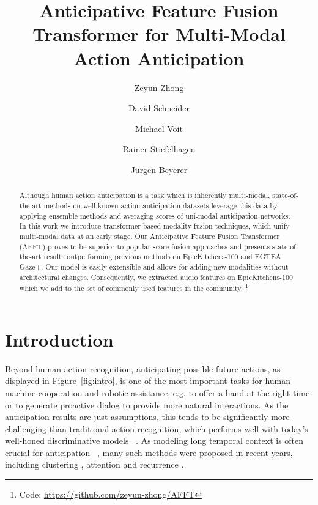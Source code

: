 \documentclass[10pt,twocolumn,letterpaper,dvipsnames]{article}
\begin{document}
\title{Anticipative Feature Fusion Transformer for Multi-Modal Action Anticipation}

\author[1,2\thanks{Equal contribution}]{Zeyun Zhong}
\author[2$^*$]{David Schneider}
\author[1]{Michael Voit}
\author[2]{Rainer Stiefelhagen}
\author[1,2]{Jürgen Beyerer}

\maketitle
\thispagestyle{empty}

\begin{abstract}
Although human action anticipation is a task which is inherently multi-modal, state-of-the-art methods on well known action anticipation datasets leverage this data by applying ensemble methods and averaging scores of uni-modal anticipation networks. In this work we introduce transformer based modality fusion techniques, which unify multi-modal data at an early stage. Our Anticipative Feature Fusion Transformer (AFFT) proves to be superior to popular score fusion approaches and presents state-of-the-art results outperforming previous methods on EpicKitchens-100 and EGTEA Gaze+. Our model is easily extensible and allows for adding new modalities without architectural changes. Consequently, we extracted audio features on EpicKitchens-100 which we add to the set of commonly used features in the community. \footnote{Code: \url{https://github.com/zeyun-zhong/AFFT}}
\end{abstract} \section{Introduction}
Beyond human action recognition, anticipating possible future actions, as displayed in Figure~\ref{fig:intro}, is one of the most important tasks for human machine cooperation and robotic assistance, e.g. to offer a hand at the right time or to generate proactive dialog to provide more natural interactions. As the anticipation results are just assumptions, this tends to be significantly more challenging than traditional action recognition, which performs well with today’s well-honed discriminative models
~\cite{feichtenhofer2019slowfast,liu2022video}.
As modeling long temporal context is often crucial for anticipation~ \cite{furnariWhatWouldYou2019,senerTemporalAggregateRepresentations2020,girdharAnticipativeVideoTransformer2021}, many such methods were proposed in recent years, including clustering \cite{girdhar2017actionvlad,miechLearnablePoolingContext2017}, attention \cite{senerTemporalAggregateRepresentations2020} and recurrence \cite{furnariWhatWouldYou2019}.
\end{document}
